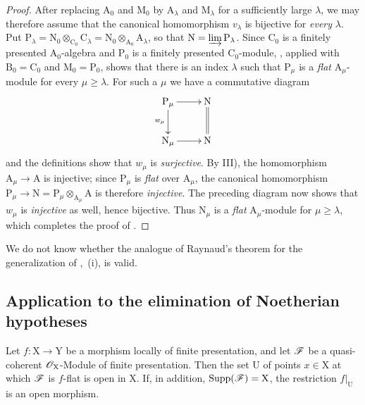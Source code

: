 \begin{proof}
After replacing $\mathrm{A}_0$ and $\mathrm{M}_0$ by
$\mathrm{A}_\lambda$ and $\mathrm{M}_\lambda$ for a sufficiently large
$\lambda$, we may therefore assume that the canonical homomorphism
$v_\lambda$ is bijective for \emph{every} $\lambda$. Put $\mathrm{P}_\lambda
=\mathrm{N}_0\otimes_{\mathrm{C}_0}\mathrm{C}_\lambda
=\mathrm{N}_0\otimes_{\mathrm{A}_0}\mathrm{A}_\lambda$,
so that $\mathrm{N}=\varinjlim\mathrm{P}_\lambda$. Since
$\mathrm{C}_0$ is a finitely presented $\mathrm{A}_0$-algebra and
$\mathrm{P}_0$ is a finitely presented $\mathrm{C}_0$-module,
, applied with
$\mathrm{B}_0=\mathrm{C}_0$ and $\mathrm{M}_0=\mathrm{P}_0$, shows that
there is an index $\lambda$ such that $\mathrm{P}_\mu$ is a \emph{flat}
$\mathrm{A}_\mu$-module for every $\mu\geqslant\lambda$. For such a
$\mu$ we have a commutative diagram
\[
\xymatrix{
  \mathrm{P}_\mu \ar[r] \ar[d]_{w_\mu} & \mathrm{N} \ar@{=}[d] \\
  \mathrm{N}_\mu \ar[r] & \mathrm{N}
}
\]
and the definitions show that $w_\mu$ is \emph{surjective}. By III), the
homomorphism $\mathrm{A}_\mu\to\mathrm{A}$ is injective; since
$\mathrm{P}_\mu$ is \emph{flat} over $\mathrm{A}_\mu$, the canonical
homomorphism $\mathrm{P}_\mu\longrightarrow
\mathrm{N}
=\mathrm{P}_\mu\otimes_{\mathrm{A}_\mu}\mathrm{A}$
is therefore \emph{injective}. The preceding diagram now shows that
$w_\mu$ is \emph{injective} as well, hence bijective. Thus
$\mathrm{N}_\mu$ is a \emph{flat} $\mathrm{A}_\mu$-module for
$\mu\geqslant\lambda$, which completes the proof of
.
\end{proof}

\begin{remark}[11.2.10]
\label{IV.11.2.10}
We do not know whether the analogue of Raynaud's theorem for the
generalization of ,~(i), is valid.
\end{remark}

\subsection{Application to the elimination of Noetherian hypotheses}
\label{subsection:IV.11.3}
\label{IV.11.3}


\begin{theorem}[11.3.1]
\label{IV.11.3.1}
Let $f:\mathrm{X}\to\mathrm{Y}$ be a morphism locally of finite
presentation, and let $\mathscr{F}$ be a quasi-coherent
$\mathscr{O}_\mathrm{X}$-Module of finite presentation. Then the set
$\mathrm{U}$ of points $x\in\mathrm{X}$ at which $\mathscr{F}$ is
$f$-flat is open in $\mathrm{X}$. If, in addition,
$\operatorname{Supp}(\mathscr{F})=\mathrm{X}$, the restriction
$f|_\mathrm{U}$ is an open morphism.
\end{theorem}

